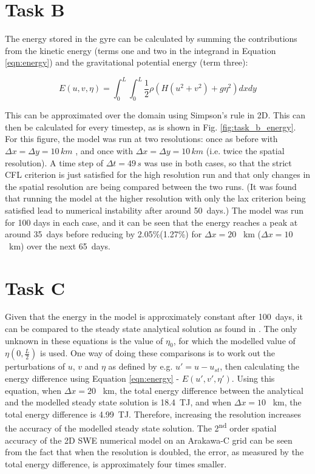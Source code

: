 \documentclass{article}
\newcommand{\ts}{\textsuperscript}
\begin{document}
\section*{Task B}

The energy stored in the gyre can be calculated by summing the contributions from the kinetic energy
(terms one and two in the integrand in Equation \ref{eqn:energy}) and the gravitational potential
energy (term three):

\begin{equation}
    \label{eqn:energy} 
    E(u, v, \eta) = \int_0^L \int_0^L \frac{1}{2} \rho ( H ( u^2 + v^2) + g \eta^2) dx dy
\end{equation}

This can be approximated over the domain using Simpson's rule in 2D. This can then be calculated for
every timestep, as is shown in Fig. \ref{fig:task_b_energy}. For this figure, the model was run at
two resolutions: once as before with $\Delta x = \Delta y = 10\, km$ , and once with $\Delta x =
\Delta y = 10\, km$ (i.e. twice the spatial resolution). A time step of $\Delta t = 49\, s$ was use
in both cases, so that the strict CFL criterion is just satisfied for the high resolution run and
that only changes in the spatial resolution are being compared between the two runs. (It was found
that running the model at the higher resolution with only the lax criterion being satisfied lead to
numerical instability after around \SI{50}{days}.) The model was run for 100 days in each case, and
it can be seen that the energy reaches a peak at around \SI{35}{days} before reducing by
2.05\%(1.27\%) for $\Delta x = 20$ \SI{}{km} ($\Delta x = 10$ \SI{}{km}) over the next
\SI{65}{days}.

\section*{Task C}

Given that the energy in the model is approximately constant after \SI{100}{days}, it can be
compared to the steady state analytical solution as found in \textcite{musgrave1985numerical}. The
only unknown in these equations is the value of $\eta_0$, for which the modelled value of $\eta(0,
\frac{L}{2})$ is used. One way of doing these comparisons is to work out the perturbations of $u$,
$v$ and $\eta$ as defined by e.g. $u' = u - u_{st}$, then calculating the energy difference using
Equation \ref{eqn:energy} - $E(u', v', \eta')$. Using this equation, when $\Delta x = 20$ \SI{}{km},
the total energy difference between the analytical and the modelled steady state solution is
\SI{18.4}{TJ}, and when $\Delta x = 10$ \SI{}{km}, the total energy difference is \SI{4.99}{TJ}.
Therefore, increasing the resolution increases the accuracy of the modelled steady state solution.
The 2\ts{nd} order spatial accuracy of the 2D SWE numerical model on an Arakawa-C grid can be seen
from the fact that when the resolution is doubled, the error, as measured by the total energy
difference, is approximately four times smaller. 
\end{document}
